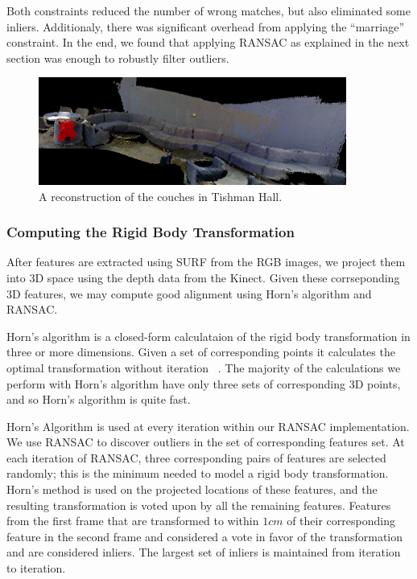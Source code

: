 \documentclass[letterpaper, 10pt, conference]{ieeeconf}
\begin{document}
Both constraints reduced the number of wrong matches, but also eliminated some inliers.
Additionaly, there was significant overhead from applying the ``marriage'' constraint.
In the end, we found that applying RANSAC as explained in the next section was enough
to robustly filter outliers.

\begin{figure}[t]
\centering
\includegraphics[width=0.9\textwidth]{figures/awesome_couch.png}
\caption{A reconstruction of the couches in Tishman Hall.}
\label{fig:couch}
\end{figure}

\subsubsection{Computing the Rigid Body Transformation}
\label{ransac}
After features are extracted using SURF from the RGB images, we project
them into 3D space using the depth data from the Kinect. Given these
corrseponding 3D features, we may compute good alignment using Horn's
algorithm and RANSAC.

Horn's algorithm is a closed-form calculataion of the rigid body
transformation in three or more dimensions.  Given a set of corresponding
points it calculates the optimal transformation without iteration
~\cite{horn1987closed}.  The majority of the calculations we perform with
Horn's algorithm have only three sets of corresponding 3D points, and so
Horn's algorithm is quite fast.

Horn's Algorithm is used at every iteration within our RANSAC implementation.
We use RANSAC to discover outliers in the set of corresponding features
set.  At each iteration of RANSAC, three corresponding pairs of features
are selected randomly; this is the minimum needed to model a rigid body
transformation.  Horn's method is used on the projected locations of these
features, and the resulting transformation is voted upon by all the remaining
features.  Features from the first frame that are transformed to within $1cm$
of their corresponding feature in the second frame and considered a vote in
favor of the transformation and are considered inliers.  The largest set of
inliers is maintained from iteration to iteration.
\end{document}
